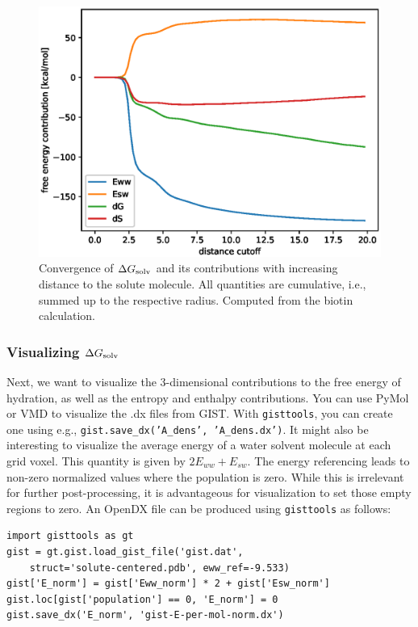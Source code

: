 \documentclass[9pt,tutorial]{livecoms}
\newcommand{\dgsolv}{\Delta G_\textup{solv}}
\newcommand{\software}{\texttt}
\newcommand\inlinecode{\texttt}
\begin{document}
\begin{figure}
	\centering
	\includegraphics[width=0.8\linewidth]{figures/A_E_S_convergence.eps}
	\caption{Convergence of $\dgsolv$ and its contributions with increasing distance to the solute molecule. All quantities are cumulative, i.e., summed up to the respective radius. Computed from the biotin calculation.}\label{fig_radial_convergence}
\end{figure}
\pagebreak %
\subsubsection{Visualizing $\dgsolv$}
Next, we want to visualize the 3-dimensional contributions to the free energy of hydration, as well as the entropy and enthalpy contributions.
You can use PyMol\cite{pymol} or VMD\cite{vmd} to visualize the .dx files from GIST\@.
With \software{gisttools}, you can create one using e.g., \inlinecode{gist.save\_dx('A\_dens', 'A\_dens.dx')}.
It might also be interesting to visualize the average energy of a water solvent molecule at each grid voxel.
This quantity is given by $2E_{ww} + E_{sw}$.
The energy referencing leads to non-zero normalized values where the population is zero.
While this is irrelevant for further post-processing, it is advantageous for visualization to set those empty regions to zero.
An OpenDX file can be produced using \software{gisttools} as follows:

\begin{lstlisting}[style=python]
import gisttools as gt
gist = gt.gist.load_gist_file('gist.dat',
    struct='solute-centered.pdb', eww_ref=-9.533)
gist['E_norm'] = gist['Eww_norm'] * 2 + gist['Esw_norm']
gist.loc[gist['population'] == 0, 'E_norm'] = 0
gist.save_dx('E_norm', 'gist-E-per-mol-norm.dx')
\end{lstlisting}
\end{document}
